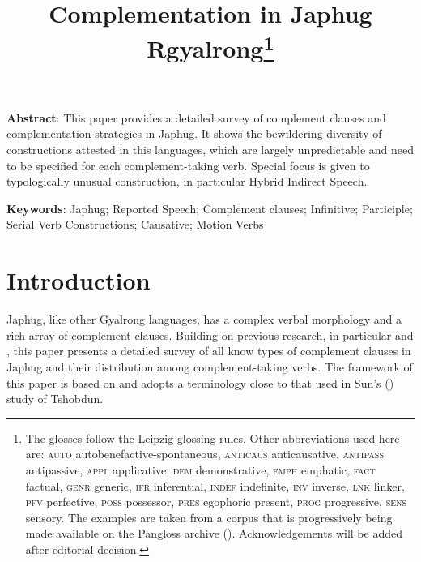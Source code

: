 \documentclass[oneside,a4paper,11pt]{article}
\begin{document}
 

\title{Complementation in Japhug Rgyalrong\footnote{The glosses follow the Leipzig glossing rules. Other abbreviations used here are: \textsc{auto}  autobenefactive-spontaneous, \textsc{anticaus} anticausative, \textsc{antipass} antipassive, \textsc{appl} applicative, \textsc{dem} demonstrative,  \textsc{emph} emphatic, \textsc{fact} factual, \textsc{genr} generic, \textsc{ifr} inferential, \textsc{indef} indefinite, \textsc{inv} inverse,  \textsc{lnk} linker, \textsc{pfv} perfective, \textsc{poss} possessor, \textsc{pres} egophoric present, \textsc{prog} progressive, \textsc{sens} sensory. The examples are taken from a corpus that is progressively being made available on the Pangloss archive (\citealt{michailovsky14pangloss}). Acknowledgements   will be added after editorial decision.}} %
\maketitle
\linenumbers

\textbf{Abstract}: This paper provides a detailed survey of complement clauses and complementation strategies in Japhug. It shows the bewildering diversity of constructions attested in this languages, which are largely unpredictable and need to be specified for each complement-taking verb. Special focus is given to typologically unusual construction, in particular Hybrid Indirect Speech.

\textbf{Keywords}: Japhug; Reported Speech; Complement clauses; Infinitive; Participle; Serial Verb Constructions; Causative; Motion Verbs

\section{Introduction}
Japhug, like other Gyalrong languages, has a complex verbal morphology and a rich array of complement clauses. Building on previous research, in particular  \citet[337-356]{jacques08} and \citet{sun12complementation}, this paper presents a detailed survey of all know types of complement clauses in Japhug and their distribution among complement-taking verbs. The framework of this paper is based on  \citet[9]{dixon06complementation} and adopts a terminology close to that used in Sun's (\citeyear{sun12complementation}) study of Tshobdun.
\end{document}
